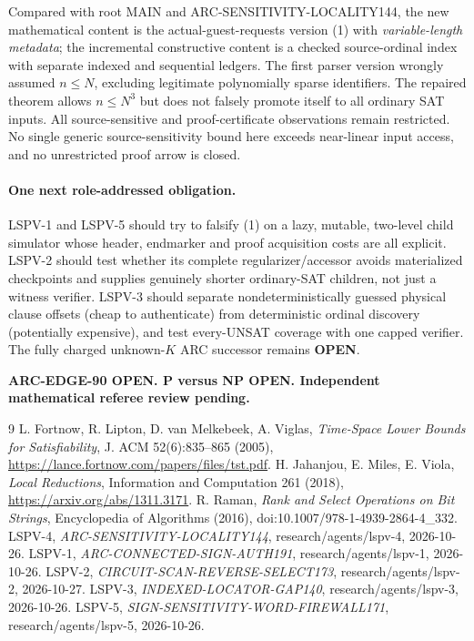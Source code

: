 \documentclass[11pt]{article}
\begin{document}
Compared with root MAIN and ARC-SENSITIVITY-LOCALITY144, the new mathematical content is the actual-guest-requests version (1) with \emph{variable-length metadata}; the incremental constructive content is a checked source-ordinal index with separate indexed and sequential ledgers. The first parser version wrongly assumed $n\le N$, excluding legitimate polynomially sparse identifiers. The repaired theorem allows $n\le N^3$ but does not falsely promote itself to all ordinary SAT inputs. All source-sensitive and proof-certificate observations remain restricted. No single generic source-sensitivity bound here exceeds near-linear input access, and no unrestricted proof arrow is closed.

\paragraph{One next role-addressed obligation.}
LSPV-1 and LSPV-5 should try to falsify (1) on a lazy, mutable, two-level child simulator whose header, endmarker and proof acquisition costs are all explicit. LSPV-2 should test whether its complete regularizer/accessor avoids materialized checkpoints and supplies genuinely shorter ordinary-SAT children, not just a witness verifier. LSPV-3 should separate nondeterministically guessed physical clause offsets (cheap to authenticate) from deterministic ordinal discovery (potentially expensive), and test every-UNSAT coverage with one capped verifier. The fully charged unknown-$K$ ARC successor remains \textbf{OPEN}.

\noindent\textbf{ARC-EDGE-90 OPEN. P versus NP OPEN. Independent mathematical referee review pending.}
\begin{thebibliography}{9}
 L. Fortnow, R. Lipton, D. van Melkebeek, A. Viglas, \emph{Time-Space Lower Bounds for Satisfiability}, J. ACM 52(6):835--865 (2005), \url{https://lance.fortnow.com/papers/files/tst.pdf}.
 H. Jahanjou, E. Miles, E. Viola, \emph{Local Reductions}, Information and Computation 261 (2018), \url{https://arxiv.org/abs/1311.3171}.
 R. Raman, \emph{Rank and Select Operations on Bit Strings}, Encyclopedia of Algorithms (2016), doi:10.1007/978-1-4939-2864-4\_332.
 LSPV-4, \emph{ARC-SENSITIVITY-LOCALITY144}, research/agents/lspv-4, 2026-10-26.
 LSPV-1, \emph{ARC-CONNECTED-SIGN-AUTH191}, research/agents/lspv-1, 2026-10-26.
 LSPV-2, \emph{CIRCUIT-SCAN-REVERSE-SELECT173}, research/agents/lspv-2, 2026-10-27.
 LSPV-3, \emph{INDEXED-LOCATOR-GAP140}, research/agents/lspv-3, 2026-10-26.
 LSPV-5, \emph{SIGN-SENSITIVITY-WORD-FIREWALL171}, research/agents/lspv-5, 2026-10-26.
\end{thebibliography}
\end{document}
